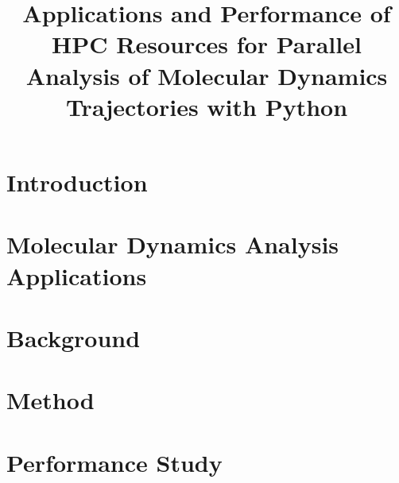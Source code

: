 \documentclass[10pt]{article}
\begin{document}
    
\title{Applications and Performance of HPC Resources for Parallel Analysis of Molecular Dynamics Trajectories with Python}





    
\maketitle


\section{Introduction}


\section{Molecular Dynamics Analysis Applications}


\section{Background}


\section{Method}


\section{Performance Study}

\end{document}

